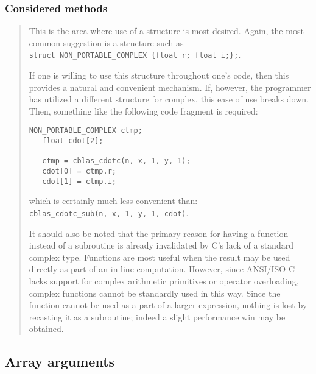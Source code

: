\documentclass{article}
\begin{document}
\subsubsection{Considered methods}
{\it
\begin{quotation}
This is the area where use of a structure is most desired.  Again, the most
common suggestion is a structure such as\\
\verb+struct NON_PORTABLE_COMPLEX {float r; float i;};+.

If one is willing to use this structure throughout one's code, then this
provides a natural and convenient mechanism.  If, however, the programmer has
utilized a different structure for complex, this ease of use breaks down.  Then,
something like the following code fragment is required:
\begin{Verbatim}[fontsize=\small,fontfamily=tt,fontshape=rm]
   NON_PORTABLE_COMPLEX ctmp;
   float cdot[2];

   ctmp = cblas_cdotc(n, x, 1, y, 1);
   cdot[0] = ctmp.r;
   cdot[1] = ctmp.i;
\end{Verbatim}
which is certainly much less convenient than:\\
\verb+cblas_cdotc_sub(n, x, 1, y, 1, cdot)+.

It should also be noted that the primary reason for having a function instead
of a subroutine is already invalidated by C's lack of a standard complex type.
Functions are most useful when the result may be used directly as part of
an in-line computation.  However, since ANSI/ISO C lacks support for
complex arithmetic primitives or operator overloading, complex functions cannot
be standardly used in this way.  Since the function cannot be used as a part
of a larger expression, nothing is lost by recasting it as a subroutine;
indeed a slight performance win may be obtained.
\end{quotation}
}

\subsection{Array arguments}\label{legacy:c_arrayarguments}

\end{document}
